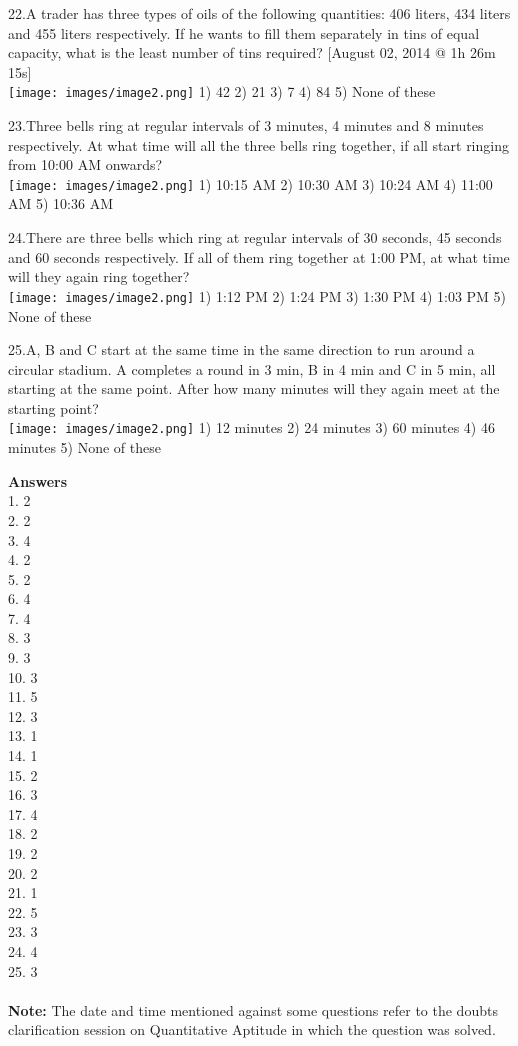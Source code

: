 \documentclass[
]{article}
\begin{document}
22.A trader has three types of oils of the following quantities: 406 liters, 434 liters and 455 liters respectively. If he wants to fill them separately in tins of equal capacity, what is the least number of tins required? [August 02, 2014 @ 1h 26m 15s] \\
\texttt{[image: images/image2.png]} 1) 42 2) 21 3) 7 4) 84 5) None of these

23.Three bells ring at regular intervals of 3 minutes, 4 minutes and 8 minutes respectively. At what time will all the three bells ring together, if all start ringing from 10:00 AM onwards?\\
\texttt{[image: images/image2.png]}  1) 10:15 AM 	2) 10:30 AM   3) 10:24 AM   4) 11:00 AM   5) 10:36 AM

24.There are three bells which ring at regular intervals of 30 seconds, 45 seconds and 60 seconds respectively. If all of them ring together at 1:00 PM, at what time will they again ring together? \\
\texttt{[image: images/image2.png]} 1) 1:12 PM 	2) 1:24 PM 	3) 1:30 PM 	4) 1:03 PM 	5) None of these

25.A, B and C start at the same time in the same direction to run around a circular stadium. A completes a round in 3 min, B in 4 min and C in 5 min, all starting at the same point. After how many minutes will they again meet at the starting point? \\
\texttt{[image: images/image2.png]} 1) 12 minutes 	2) 24 minutes  3) 60 minutes  4) 46 minutes  5) None of these
\newpage

{\large \textbf{Answers \\}}
1.  2 \\
2.  2 \\
3.  4 \\
4.  2 \\
5.  2 \\
6.  4 \\
7.  4 \\
8.  3 \\
9.  3 \\
10. 3 \\
11. 5 \\
12. 3 \\
13. 1 \\
14. 1 \\
15. 2 \\
16. 3 \\
17. 4 \\
18. 2 \\
19. 2 \\
20. 2 \\
21. 1 \\
22. 5 \\
23. 3 \\
24. 4 \\
25. 3 \\



\textbf{\\ Note:} The date and time mentioned against some questions refer to the doubts clarification session on Quantitative Aptitude in which the question was solved.
\end{document}
